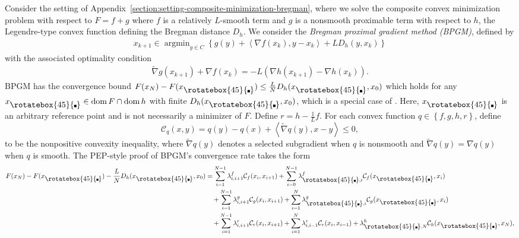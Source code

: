 \documentclass{article}
\theoremstyle{definition}
\theoremstyle{plain}
\newcommand{\cC}{{\mathcal{C}}}
\newcommand{\tnabla}{\widetilde{\nabla}}
\DeclareMathOperator*{\argmin}{argmin}
\newcommand{\inprod}[2]{\left\langle #1,#2 \right\rangle}
\newcommand{\pr}[1]{\left( #1 \right)}
\newcommand{\set}[1]{\left\{ #1 \right\}}
\newcommand{\compidx}{%
  \mathord{\mathchoice
    {\vcenter{\hbox{\rotatebox{45}{\rule{0.39em}{0.39em}}}}}
    {\vcenter{\hbox{\rotatebox{45}{\rule{0.39em}{0.39em}}}}}
    {\vcenter{\hbox{\rotatebox{45}{\rule{0.29em}{0.29em}}}}}
    {\vcenter{\hbox{\rotatebox{45}{\rule{0.23em}{0.23em}}}}}}%
}
\newcommand{\bregsm}{f}
\newcommand{\bregprox}{g}
\newcommand{\bregaux}{r}
\begin{document}
Consider the setting of Appendix~\ref{section:setting-composite-minimization-bregman}, 
where we solve the composite convex minimization problem with respect to $F = \bregsm+\bregprox$ where $\bregsm$ is a relatively $L$-smooth term and $\bregprox$ is a nonsmooth proximable term with respect to $h$, the Legendre-type convex function defining the Bregman distance $D_h$.
We consider the \textit{Bregman proximal gradient method (BPGM)}, defined by
\begin{align}
\label{eq:bpgm_main}
\tag{BPGM}
    x_{k+1}\in \argmin_{y\in C}
    \left\{
        \bregprox(y)+\inprod{\nabla \bregsm(x_k)}{y-x_k}
        +L D_h(y,x_k)
    \right\} 
\end{align}
with the associated optimality condition 
\begin{align}
\label{eq:bpgm_optimality_main}
    \tnabla \bregprox(x_{k+1})+\nabla \bregsm(x_k)
    =-L\pr{\nabla h(x_{k+1})-\nabla h(x_k)}.
\end{align}
BPGM has the convergence bound $F(x_N)-F(x_{\compidx})\le \frac{L}{N}D_h(x_{\compidx}, x_0)$ which holds for any $x_{\compidx} \in \operatorname{dom}F\cap\operatorname{dom}h$ with finite $D_h(x_{\compidx},x_0)$, which is a special case of \cite[Corollary~1]{GutmanPena2023_perturbed}. 
Here, $x_{\compidx}$ is an arbitrary reference point and is not necessarily a minimizer of $F$.
Define $\bregaux = h - \frac{1}{L}\bregsm$.
For each convex function $q \in \set{\bregsm,\bregprox,h,\bregaux}$, define
\[
    \cC_q(x,y) = q(y)-q(x)+\inprod{\tnabla q(y)}{x-y}\le 0,
\]
to be the nonpositive convexity inequality, 
where $\tnabla q(y)$ denotes a selected subgradient when $q$ is nonsmooth and $\tnabla q(y)=\nabla q(y)$ when $q$ is smooth. 
The PEP-style proof of BPGM's convergence rate takes the form
\begin{align}
    F(x_N)-F(x_{\compidx})-\frac{L}{N}D_h(x_{\compidx},x_0)
    &=
    \sum_{i=1}^{N-1}\lambda^{\bregsm}_{i,i+1} \cC_{\bregsm}(x_i,x_{i+1})
    +\sum_{i=0}^{N-1}\lambda^{\bregsm}_{\compidx,i} \cC_{\bregsm}(x_{\compidx},x_i) \nonumber \\
    &\quad
    +\sum_{i=1}^{N-1}\lambda^{\bregprox}_{i,i+1} \cC_{\bregprox}(x_i,x_{i+1})
    +\sum_{i=1}^{N}\lambda^{\bregprox}_{\compidx,i} \cC_{\bregprox}(x_{\compidx},x_i) \nonumber \\
    &\quad
    +\sum_{i=1}^{N-1}\lambda^{\bregaux}_{i,i+1} \cC_{\bregaux}(x_i,x_{i+1})
    +\sum_{i=1}^{N}\lambda^{\bregaux}_{i,i-1} \cC_{\bregaux}(x_i,x_{i-1})
    +\lambda^h_{\compidx,N} \cC_h(x_{\compidx},x_N),
    \label{eq:bpgm_full_pep_certificate}
\end{align}
\end{document}
